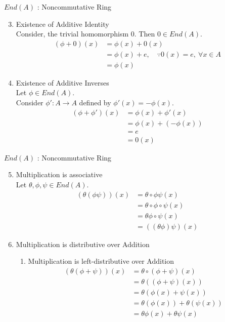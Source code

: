 \documentclass{beamer}
\begin{document}
\begin{frame}{$End(A)$ : Noncommutative Ring}
\begin{enumerate}
	\setcounter{enumi}{2}
	\item Existence of Additive Identity\\
		Consider, the trivial homomorphism $0$. Then $0 \in End(A)$.
	\begin{align*}
		(\phi + 0)(x) & = \phi(x) + 0(x) \\
		& = \phi(x) + e, \quad \because 0(x) = e,\ \forall x \in A\\
		& = \phi(x)
	\end{align*}
	\item Existence of Additive Inverses\\
	Let $\phi \in End(A)$.\\
	Consider $\phi' : A \to A$ defined by $\phi'(x) = -\phi(x)$.
	\begin{align*}
		(\phi+\phi')(x) & = \phi(x) + \phi'(x) \\
		& = \phi(x) + (-\phi(x)) \\
		& = e \\
		& = 0(x)
	\end{align*}
\end{enumerate}
\end{frame}

\begin{frame}{$End(A)$ : Noncommutative Ring}
\begin{enumerate}
	\setcounter{enumi}{4}
	\item Multiplication is associative\\
		Let $\theta, \phi, \psi \in End(A)$.
		\begin{align*}
			(\theta (\phi\psi))(x) & = \theta \circ \phi\psi(x) \\
			& = \theta \circ \phi \circ \psi(x) \\
			& = \theta\phi \circ \psi(x) \\
			& = ((\theta\phi)\psi)(x)
		\end{align*}
	\item Multiplication is distributive over Addition
	\begin{enumerate}
		\item Multiplication is left-distributive over Addition
		\begin{align*}
			(\theta(\phi+\psi))(x) & = \theta \circ (\phi+\psi)(x) \\ 
			& = \theta((\phi+\psi)(x)) \\
			& = \theta(\phi(x) + \psi(x)) \\
			& = \theta(\phi(x)) + \theta(\psi(x)) \\
			& = \theta\phi(x) + \theta\psi(x)
		\end{align*}
	\end{enumerate}
\end{enumerate}
\end{frame}
\end{document}
